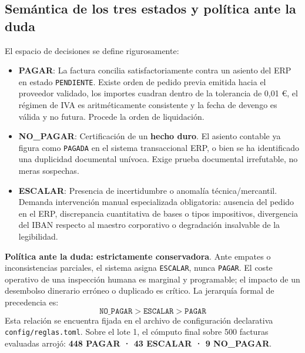 \documentclass[11pt,a4paper]{article}
\begin{document}
\subsection{Semántica de los tres estados y política ante la duda}
El espacio de decisiones se define rigurosamente:
\begin{itemize}
    \item \textbf{\color{colorPAGAR}PAGAR}: La factura concilia satisfactoriamente contra un asiento del ERP en estado \texttt{PENDIENTE}. Existe orden de pedido previa emitida hacia el proveedor validado, los importes cuadran dentro de la tolerancia de 0,01 €, el régimen de IVA es aritméticamente consistente y la fecha de devengo es válida y no futura. Procede la orden de liquidación.
    \item \textbf{\color{colorNOPAGAR}NO\_PAGAR}: Certificación de un \textbf{hecho duro}. El asiento contable ya figura como \texttt{PAGADA} en el sistema transaccional ERP, o bien se ha identificado una duplicidad documental unívoca. Exige prueba documental irrefutable, no meras sospechas.
    \item \textbf{\color{colorESCALAR}ESCALAR}: Presencia de incertidumbre o anomalía técnica/mercantil. Demanda intervención manual especializada obligatoria: ausencia del pedido en el ERP, discrepancia cuantitativa de bases o tipos impositivos, divergencia del IBAN respecto al maestro corporativo o degradación insalvable de la legibilidad.
\end{itemize}

\textbf{Política ante la duda: estrictamente conservadora}. Ante empates o inconsistencias parciales, el sistema asigna \texttt{ESCALAR}, nunca \texttt{PAGAR}. El coste operativo de una inspección humana es marginal y programable; el impacto de un desembolso dinerario erróneo o duplicado es crítico. La jerarquía formal de precedencia es:
$$\texttt{NO\_PAGAR} > \texttt{ESCALAR} > \texttt{PAGAR}$$
Esta relación se encuentra fijada en el archivo de configuración declarativa \texttt{config/reglas.toml}. Sobre el lote 1, el cómputo final sobre 500 facturas evaluadas arrojó: \textbf{448 PAGAR · 43 ESCALAR · 9 NO\_PAGAR}.
\end{document}
